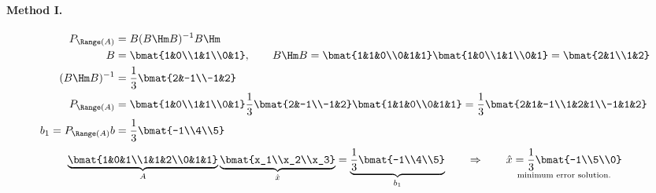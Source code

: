 \begin{example}
\paragraph{Method I.}
\begin{align*}
P_{\Range(A)}&=B(B\Hm B)^{-1}B\Hm\\
B&=\bmat{1&0\\1&1\\0&1},\qquad B\Hm B=\bmat{1&1&0\\0&1&1}\bmat{1&0\\1&1\\0&1}=\bmat{2&1\\1&2}\\
(B\Hm B)^{-1}&=\frac13\bmat{2&-1\\-1&2}\\
P_{\Range(A)}&=\bmat{1&0\\1&1\\0&1}\frac13\bmat{2&-1\\-1&2}\bmat{1&1&0\\0&1&1}=\frac13\bmat{2&1&-1\\1&2&1\\-1&1&2}\\
b_1=P_{\Range(A)}b&=\frac13\bmat{-1\\4\\5}
\end{align*}
\[
\underbrace{\bmat{1&0&1\\1&1&2\\0&1&1}}_{A}\underbrace{\bmat{x_1\\x_2\\x_3}}_{\hat{x}}=\underbrace{\frac13\bmat{-1\\4\\5}}_{b_1}
\qquad\Rightarrow\qquad \underset{\text{minimum error solution.}}{\hat{x}=\frac13\bmat{-1\\5\\0}}
\]


\end{example}
